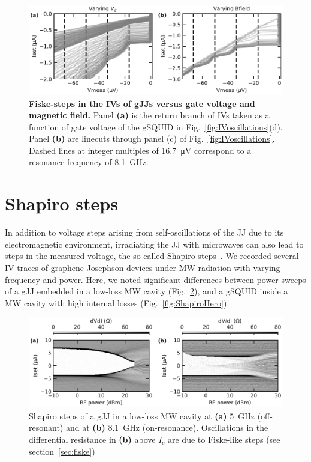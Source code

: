 \begin{figure}
	\centering
	\includegraphics[width=\linewidth]{appendix/gJJ-misc-figs/fig_IVsteps}
	\caption{
		\textbf{Fiske-steps in the IVs of gJJs versus gate voltage and magnetic field.}
		Panel \textbf{(a)} is the return branch of IVs taken as a function of gate voltage of the gSQUID in Fig.~\ref{fig:IVoscillations}(d).
		Panel \textbf{(b)} are linecuts through panel (c) of Fig.~\ref{fig:IVoscillations}.
		Dashed lines at integer multiples of \SI{16.7}{\micro\volt} correspond to a resonance frequency of \SI{8.1}{\giga\hertz}.
	}
	\label{fig:IVsteps}
\end{figure}


\section{Shapiro steps}\label{sec:shapiro}

In addition to voltage steps arising from self-oscillations of the JJ due to its electromagnetic environment, irradiating the JJ with microwaves can also lead to steps in the measured voltage, the so-called Shapiro steps~\cite{shapiroJosephsonCurrentsSuperconducting1963,kautzNoiseChaosJosephson1996,tinkhamIntroductionSuperconductivity1996,heerscheBipolarSupercurrentGraphene2007a,leeUltimatelyShortBallistic2015,shellyExistenceShapiroSteps2020,larsonZerobiasCrossingsPeculiar2020}.
%
We recorded several IV traces of graphene Josephson devices under MW radiation with varying frequency and power.
%
Here, we noted significant differences between power sweeps of a gJJ embedded in a low-loss MW cavity (Fig.~\ref{fig:Shapiro2x1}), and a gSQUID inside a MW cavity with high internal losses (Fig.~\ref{fig:ShapiroHero}).

\begin{figure}
	\centering
	\includegraphics[width=\linewidth]{appendix/gJJ-misc-figs/fig_Shapiro2x1}
	\caption{
		Shapiro steps of a gJJ in a low-loss MW cavity at \textbf{(a)} \SI{5}{\giga\hertz} (off-resonant) and at \textbf{(b)} \SI{8.1}{\giga\hertz} (on-resonance).
		Oscillations in the differential resistance in \textbf{(b)} above $I_c$ are due to Fiske-like steps (see section~\ref{sec:fiske})
	}
	\label{fig:Shapiro2x1}
\end{figure}

